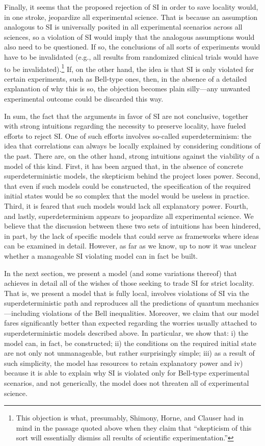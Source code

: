 \documentclass[letterpaper,12pt]{article}
\begin{document}
Finally, it seems that the proposed rejection of SI in order to save locality would, in one stroke, jeopardize all experimental science. That is because an assumption analogous to SI is universally posited in all experimental scenarios across all sciences, so a violation of SI would imply that the analogous assumptions would also need to be questioned. If so, the conclusions of all sorts of experiments would have to be invalidated (e.g., all results from randomized clinical trials would have to be invalidated).\footnote{This objection is what, presumably, Shimony, Horne, and Clauser had in mind in the passage quoted above when they claim that ``skepticism of this sort will essentially dismiss all results of scientific experimentation.''} If, on the other hand, the idea is that SI is only violated for certain experiments, such as Bell-type ones, then, in the absence of a detailed explanation of why this is so, the objection becomes plain silly---any unwanted experimental outcome could be discarded this way.

In sum, the fact that the arguments in favor of SI are not conclusive, together with strong intuitions regarding the necessity to preserve locality, have fueled efforts to reject SI. One of such efforts involves so-called superdeterminism: the idea that correlations can always be locally explained by considering conditions of the past. There are, on the other hand, strong intuitions against the viability of a model of this kind. First, it has been argued that, in the absence of concrete superdeterministic models, the skepticism behind the project loses power. Second, that even if such models could be constructed, the specification of the required initial states would be so complex that the model would be useless in practice. Third, it is feared that such models would lack all explanatory power. Fourth, and lastly, superdeterminism appears to jeopardize all experimental science. We believe that the discussion between these two sets of intuitions has been hindered, in part, by the lack of specific models that could serve as frameworks where ideas can be examined in detail. However, as far as we know, up to now it was unclear whether a manageable SI violating model can in fact be built.

In the next section, we present a model (and some variations thereof) that achieves in detail all of the wishes of those seeking to trade SI for strict locality. That is, we present a model that is fully local, involves violations of SI via the superdeterministic path and reproduces all the predictions of quantum mechanics---including violations of the Bell inequalities. Moreover, we claim that our model fares significantly better than expected regarding the worries usually attached to superdeterministic models described above. In particular, we show that: i) the model can, in fact, be constructed; ii) the conditions on the required initial state are not only not unmanageable, but rather surprisingly simple; iii) as a result of such simplicity, the model has resources to retain explanatory power and iv) because it is able to explain why SI is violated only for Bell-type experimental scenarios, and not generically, the model does not threaten all of experimental science.
\end{document}
